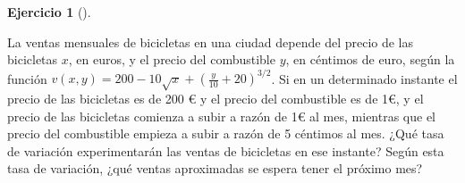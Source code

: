 \documentclass[
  spanish,
  a4paper,
]{scrreport}
\theoremstyle{definition}
\newtheorem{exercise}{Ejercicio}[chapter]
\theoremstyle{remark}
\begin{document}
\begin{exercise}[]\protect\hypertarget{exr-regla-cadena-5}{}\label{exr-regla-cadena-5}

La ventas mensuales de bicicletas en una ciudad depende del precio de
las bicicletas \(x\), en euros, y el precio del combustible \(y\), en
céntimos de euro, según la función
\(v(x,y)=200-10\sqrt{x}+(\frac{y}{10}+20)^{3/2}\). Si en un determinado
instante el precio de las bicicletas es de 200 € y el precio del
combustible es de 1€, y el precio de las bicicletas comienza a subir a
razón de 1€ al mes, mientras que el precio del combustible empieza a
subir a razón de 5 céntimos al mes. ¿Qué tasa de variación
experimentarán las ventas de bicicletas en ese instante? Según esta tasa
de variación, ¿qué ventas aproximadas se espera tener el próximo mes?

\end{exercise}
\end{document}
